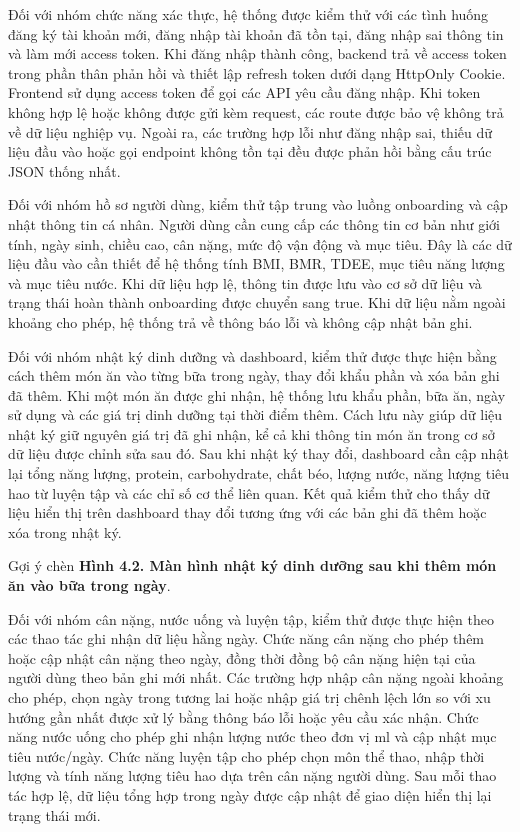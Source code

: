 \documentclass[12pt, a4paper]{report}
\begin{document}
Đối với nhóm chức năng xác thực, hệ thống được kiểm thử với các tình huống đăng ký tài khoản mới, đăng nhập tài khoản đã tồn tại, đăng nhập sai thông tin và làm mới access token. Khi đăng nhập thành công, backend trả về access token trong phần thân phản hồi và thiết lập refresh token dưới dạng HttpOnly Cookie. Frontend sử dụng access token để gọi các API yêu cầu đăng nhập. Khi token không hợp lệ hoặc không được gửi kèm request, các route được bảo vệ không trả về dữ liệu nghiệp vụ. Ngoài ra, các trường hợp lỗi như đăng nhập sai, thiếu dữ liệu đầu vào hoặc gọi endpoint không tồn tại đều được phản hồi bằng cấu trúc JSON thống nhất.

Đối với nhóm hồ sơ người dùng, kiểm thử tập trung vào luồng onboarding và cập nhật thông tin cá nhân. Người dùng cần cung cấp các thông tin cơ bản như giới tính, ngày sinh, chiều cao, cân nặng, mức độ vận động và mục tiêu. Đây là các dữ liệu đầu vào cần thiết để hệ thống tính BMI, BMR, TDEE, mục tiêu năng lượng và mục tiêu nước. Khi dữ liệu hợp lệ, thông tin được lưu vào cơ sở dữ liệu và trạng thái hoàn thành onboarding được chuyển sang true. Khi dữ liệu nằm ngoài khoảng cho phép, hệ thống trả về thông báo lỗi và không cập nhật bản ghi.

Đối với nhóm nhật ký dinh dưỡng và dashboard, kiểm thử được thực hiện bằng cách thêm món ăn vào từng bữa trong ngày, thay đổi khẩu phần và xóa bản ghi đã thêm. Khi một món ăn được ghi nhận, hệ thống lưu khẩu phần, bữa ăn, ngày sử dụng và các giá trị dinh dưỡng tại thời điểm thêm. Cách lưu này giúp dữ liệu nhật ký giữ nguyên giá trị đã ghi nhận, kể cả khi thông tin món ăn trong cơ sở dữ liệu được chỉnh sửa sau đó. Sau khi nhật ký thay đổi, dashboard cần cập nhật lại tổng năng lượng, protein, carbohydrate, chất béo, lượng nước, năng lượng tiêu hao từ luyện tập và các chỉ số cơ thể liên quan. Kết quả kiểm thử cho thấy dữ liệu hiển thị trên dashboard thay đổi tương ứng với các bản ghi đã thêm hoặc xóa trong nhật ký.

Gợi ý chèn \textbf{Hình 4.2. Màn hình nhật ký dinh dưỡng sau khi thêm món ăn vào bữa trong ngày}.

Đối với nhóm cân nặng, nước uống và luyện tập, kiểm thử được thực hiện theo các thao tác ghi nhận dữ liệu hằng ngày. Chức năng cân nặng cho phép thêm hoặc cập nhật cân nặng theo ngày, đồng thời đồng bộ cân nặng hiện tại của người dùng theo bản ghi mới nhất. Các trường hợp nhập cân nặng ngoài khoảng cho phép, chọn ngày trong tương lai hoặc nhập giá trị chênh lệch lớn so với xu hướng gần nhất được xử lý bằng thông báo lỗi hoặc yêu cầu xác nhận. Chức năng nước uống cho phép ghi nhận lượng nước theo đơn vị ml và cập nhật mục tiêu nước/ngày. Chức năng luyện tập cho phép chọn môn thể thao, nhập thời lượng và tính năng lượng tiêu hao dựa trên cân nặng người dùng. Sau mỗi thao tác hợp lệ, dữ liệu tổng hợp trong ngày được cập nhật để giao diện hiển thị lại trạng thái mới.
\end{document}
